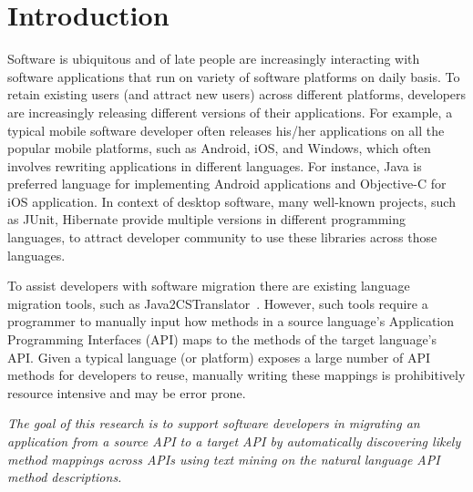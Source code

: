 \section{Introduction}
\label{sec:introduction}


Software is ubiquitous and of late people are increasingly interacting
with software applications
that run on variety of software platforms on daily basis.
To retain existing users (and attract new users) across different platforms,
developers are increasingly releasing different versions of their applications.
For example, a typical mobile software developer often releases his/her applications
on all the popular mobile platforms, such as Android, iOS, and Windows,
which often involves rewriting applications in different languages.
For instance, Java is preferred language for implementing Android applications
and Objective-C for iOS application.
In context of desktop software, many well-known projects, such as JUnit,
Hibernate provide multiple versions in different programming languages,
to attract developer community to use these
libraries across those languages.


To assist developers with software migration
there are existing language migration tools, such as Java2CSTranslator~\cite{java2cstranslator}.
However, such tools require a programmer to manually input
how methods in a source language's Application Programming Interfaces (API) maps to the methods of the target language's API. 
Given a typical language (or platform) exposes a large number of API methods for developers to reuse, manually writing these mappings is prohibitively resource intensive and may be error prone.


\textit{The goal of this research is to support software developers 
in migrating an application from a source API to a target API
by automatically discovering likely method mappings across APIs using text mining
on the natural language API method descriptions.}


